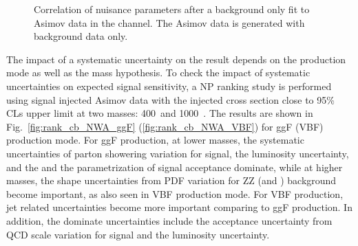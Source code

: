 \begin{figure}[!ht]
\begin{center}
\caption{Correlation of nuisance parameters after a background only fit to Asimov data in the \llll channel.
The Asimov data is generated with background data only.
}
\label{fig:NPcorr_cb_asimov}
\end{center}
\end{figure}

The impact of a systematic uncertainty on the result depends on the production mode as well as the mass hypothesis.
To check the impact of systematic uncertainties on expected signal sensitivity, a NP ranking study is performed using
signal injected Asimov data with the injected cross section close to 95\% CLs upper limit at two masses: 400~\gev and 1000~\gev.
The results are shown in Fig.~\ref{fig:rank_cb_NWA_ggF} (\ref{fig:rank_cb_NWA_VBF}) for ggF (VBF) production mode.
For ggF production, at lower masses, the systematic uncertainties of parton showering variation for signal, the luminosity uncertainty, and the and the parametrization of signal acceptance
dominate,
while at higher masses, the shape uncertainties from PDF variation for ZZ (\qqZZ and \ggZZ) background become important, as also seen in VBF production mode.
For VBF production, jet related uncertainties become more important comparing to ggF production.
In addition, the dominate uncertainties include the acceptance uncertainty from QCD scale variation for signal and the luminosity uncertainty.

